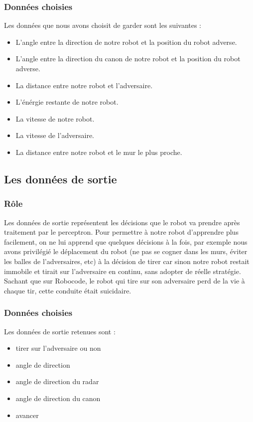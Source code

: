 \documentclass[12pt]{article}
\begin{document}
\subsubsection{Données choisies}
Les données que nous avons choisit de garder sont les suivantes :

\begin{itemize}
\item L'angle entre la direction de notre robot et la position du robot adverse.
\item L'angle entre la direction du canon de notre robot et la position du robot adverse.
\item La distance entre notre robot et l'adversaire.
\item L'énérgie restante de notre robot.
\item La vitesse de notre robot.
\item La vitesse de l'adversaire.
\item La distance entre notre robot et le mur le plus proche.
\end{itemize}

\subsection{Les données de sortie}

\subsubsection{Rôle}
Les données de sortie représentent les décisions que le robot va prendre après traitement par le perceptron. Pour permettre à notre robot d'apprendre plus facilement, on ne lui apprend que quelques décisions à la fois, par exemple nous avons privilégié le déplacement du robot (ne pas se cogner dans les murs, éviter les balles de l'adversaires, etc) à la décision de tirer car sinon notre robot restait immobile et tirait sur l'adversaire en continu, sans adopter de réelle stratégie. Sachant que sur Robocode, le robot qui tire sur son adversaire perd de la vie à chaque tir, cette conduite était suicidaire.

\subsubsection{Données choisies}
Les données de sortie retenues sont :

\begin{itemize}
\item tirer sur l'adversaire ou non
\item angle de direction
\item angle de direction du radar
\item angle de direction du canon
\item avancer
\end{itemize}
\end{document}
